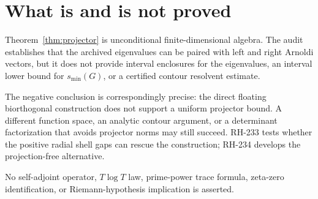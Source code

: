 \documentclass[11pt]{article}
\theoremstyle{remark}
\begin{document}
\section{What is and is not proved}

Theorem~\ref{thm:projector} is unconditional finite-dimensional algebra.  The
audit establishes that the archived eigenvalues can be paired with left and
right Arnoldi vectors, but it does not provide interval enclosures for the
eigenvalues, an interval lower bound for $s_{\min}(G)$, or a certified contour
resolvent estimate.

The negative conclusion is correspondingly precise: the direct floating
biorthogonal construction does not support a uniform projector bound.  A
different function space, an analytic contour argument, or a determinant
factorization that avoids projector norms may still succeed.  RH-233 tests
whether the positive radial shell gaps can rescue the construction; RH-234
develops the projection-free alternative.

No self-adjoint operator, $T\log T$ law, prime-power trace formula, zeta-zero
identification, or Riemann-hypothesis implication is asserted.



\end{document}
